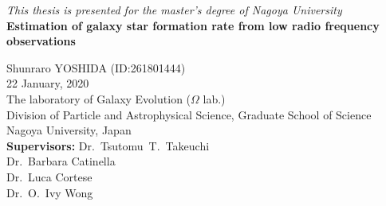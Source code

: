 \documentclass[12pt,a4paper,twoside,openright,final,titlepage]{report}
\newcommand\frontmatter{\pagenumbering{roman}}
\begin{document}
	\begin{titlepage}
		\centering
		\vfill
		\textit{This thesis is presented for the master's degree of Nagoya University}\\
        \vspace{5cm}
		{\bfseries\LARGE
				Estimation of galaxy star formation rate from low radio frequency observations \\}

        \vspace{1.5cm}

        \vspace{6cm}
        Shunraro YOSHIDA (ID:\@261801444)\\
		22 January, 2020\\
        \vspace{0.5cm}
        The laboratory of Galaxy Evolution ($\Omega$ lab.)\\
        Division of Particle and Astrophysical Science, Graduate School of Science\\
        Nagoya University, Japan\\
        \vspace{1.5cm}
 		\textbf{Supervisors:}
 		    Dr.\ Tsutomu\ T.\ Takeuchi\\
 			Dr.\ Barbara Catinella\\
 			Dr.\ Luca Cortese\\
 			Dr.\ O.\ Ivy Wong\\
	\end{titlepage}
	\frontmatter
	\clearpage
	\thispagestyle{empty}
	\phantom{a}
	\vfill
	\vfill

%	
\restoregeometry
\end{document}
